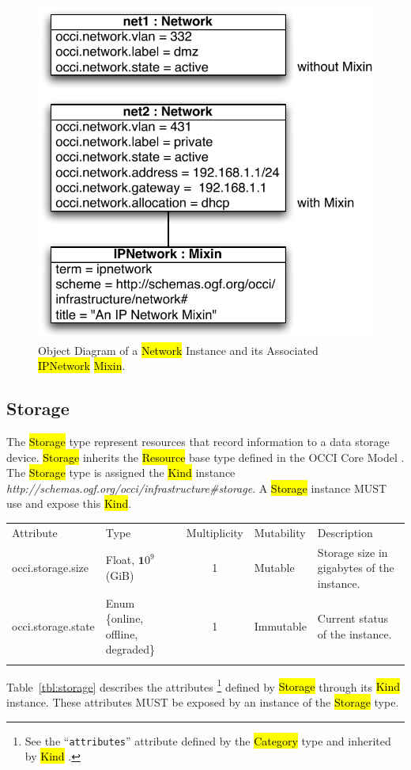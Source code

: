 \documentclass[10pt,a4paper]{article}
\begin{document}
\begin{figure}[!h]
	\centering
	\includegraphics[scale=0.5]{figs/infrastructure_mixins_obj_dia1_network}
	\caption{Object Diagram of a \hl{Network} Instance and its 
	Associated \hl{IPNetwork} \hl{Mixin}.}
	\label{fig:network_mixin}
\end{figure}

\subsection{Storage}
The \hl{Storage} type represent resources that record information to a data storage device. 
\hl{Storage} inherits the \hl{Resource} base type defined in the OCCI Core Model \cite{occi:core}.
The \hl{Storage} type is assigned the \hl{Kind} instance \textit{http://schemas.ogf.org/occi/infrastructure\#storage}.
A \hl{Storage} instance MUST use and expose this \hl{Kind}.

{
	\begin{tabular}{lp{2.8cm}clp{5cm}}
	\toprule
	Attribute&Type&Multi\-plicity&Mutability&Description\\
	\colrule
	occi.storage.size & Float, ${\mathbf 10}^9$ (GiB) & 1 & Mutable 
	& Storage size in gigabytes of the 	instance.\\
	occi.storage.state & Enum \{online, offline, degraded\} & 1 & Immutable 
	& Current status of the instance.\\
	\botrule
	\end{tabular}
}
Table~\ref{tbl:storage} describes the attributes%
\footnote{See the ``{\tt attributes}'' attribute defined by the \hl{Category}
type and inherited by \hl{Kind} \cite{occi:core}.} 
defined by \hl{Storage} through its \hl{Kind} instance. These attributes
MUST be exposed by an instance of the \hl{Storage} type.
\end{document}
